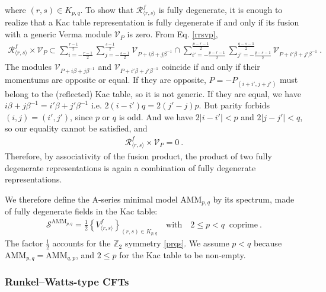 \documentclass[12pt, a4paper]{article}
\theoremstyle{break}
\begin{document}
where $(r,s)\in K_{p,q}$. To show that $\mathcal{R}^f_{\langle r,s\rangle}$ is fully degenerate, it is enough to realize that a Kac table representation is fully degenerate if and only if its fusion with a generic Verma module $\mathcal{V}_P$ is zero. From Eq. \eqref{rrsvp}, 
\begin{align}
 \mathcal{R}^f_{\langle r,s\rangle}\times \mathcal{V}_P \subset \sum_{i=-\frac{r-1}{2}}^{\frac{r-1}{2}} \sum_{j=-\frac{s-1}{2}}^{\frac{s-1}{2}} \mathcal{V}_{P+i\beta +j\beta^{-1}} \cap \sum_{i'=-\frac{p-r-1}{2}}^{\frac{p-r-1}{2}} \sum_{j'=-\frac{q-s-1}{2}}^{\frac{q-s-1}{2}} \mathcal{V}_{P+i'\beta +j'\beta^{-1}}\ .
\end{align}
The modules $\mathcal{V}_{P+i\beta +j\beta^{-1}}$ and $\mathcal{V}_{P+i'\beta +j'\beta^{-1}}$ coincide if and only if their momentums are opposite or equal. If they are opposite, $P=-P_{(i+i',j+j')}$ must belong to the (reflected) Kac table, so it is not generic. If they are equal, we have $i\beta +j\beta^{-1} = i'\beta +j'\beta^{-1}$ i.e. $2(i-i')q = 2(j'-j)p$. 
But parity forbids $(i,j)=(i',j')$, since $p$ or $q$ is odd. And we have $2|i-i'|<p$ and $2|j-j'|<q$, so our equality cannot be satisfied, and 
\begin{align}
 \mathcal{R}^f_{\langle r,s\rangle}\times \mathcal{V}_P = 0 \ . 
\end{align}
Therefore, by associativity of the fusion product, the product of two fully degenerate representations is again a combination of fully degenerate representations.

We therefore define the A-series minimal model AMM$_{p,q}$ by its spectrum, made of fully degenerate fields in the Kac table:
\begin{align}
 \boxed{\mathcal{S}^{\text{AMM}_{p,q}} = \frac12\left\{ V^f_{\langle r,s\rangle} \right\}_{(r,s)\in K_{p,q}} \quad \text{with} \quad 2\leq p<q\ \text{ coprime}}\ .
 \label{samm}
\end{align}
The factor $\frac12$ accounts for the $\mathbb{Z}_2$ symmetry \eqref{prqs}. We assume $p<q$ because AMM$_{p, q}=$AMM$_{q,p}$, and $2\leq p$ for the Kac table to be non-empty.


\subsubsection{Runkel--Watts-type CFTs}\label{sec:rwt}
\end{document}
